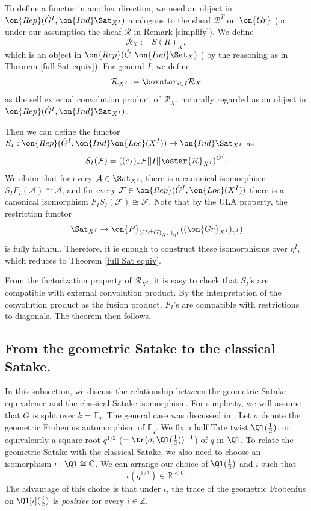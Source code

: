 \documentclass[]{pcmi}
\theoremstyle{plain}
\theoremstyle{remark}
\theoremstyle{definition}
\newcommand{\bC}{{\mathbb C}}
\newcommand{\bF}{{\mathbb F}}
\newcommand{\bR}{{\mathbb R}}
\newcommand{\bZ}{{\mathbb Z}}
\newcommand{\mA}{{\mathcal A}}
\newcommand{\mF}{{\mathcal F}}
\newcommand{\mR}{{\mathcal R}}
\newcommand{\Gr}{{\on{Gr}}}
\begin{document}
To define a functor in another direction, we need an object in $\on{Rep}(\hat G^I, {\on{Ind}\Sat_{X^I}})$ analogous to the sheaf $\mR^T$ on $\Gr$ (or under our assumption the sheaf $\mR$ in Remark \ref{simplify}).  
We define
\[\mR_X:= S(R)_X,\]
which is an object in $\on{Rep}(\hat G, {\on{Ind}\Sat_X})$ ( by the reasoning as in Theorem \ref{full Sat equiv}). For general $I$, we define
\[\mR_{X^I}:=\boxstar_{i\in I} \mR_X\]
as the self external convolution product of $\mR_X$, naturally regarded as an object in $\on{Rep}(\hat G^I,{\on{Ind}\Sat_{X^I}})$.

Then we can define the functor 
$S_{I}: \on{Rep}(\hat G^I,{\on{Ind}\on{Loc}(X^I)})\to \on{Ind}\Sat_{X^I}$ as
$$S_{I}(\mF)= ((e_I)_*\mF[|I|]\ostar\mR_{X^I})^{\hat G^I}.$$
We claim that for every $\mA\in\Sat_{X^I}$, there is a canonical isomorphism
$S_IF_I(\mA)\cong \mA$,
and for every $\mF\in \on{Rep}(\hat G^I, {\on{Loc}(X^I)})$ there is a canonical isomorphism
$F_IS_I(\mF)\cong \mF$.
Note that by the ULA property, the restriction functor
\[\Sat_{X^I}\to \on{P}_{((L^+G)_{X^I})_{\eta^I}}((\Gr_{X^I})_{\eta^I})\]
is fully faithful. Therefore, it is enough to construct these isomorphisms over $\eta^I$, which reduces to Theorem \ref{full Sat equiv}.


From the factorization property of $\mR_{X^I}$, it is easy to check that $S_I$'s are compatible with external convolution product. By the interpretation of the convolution product as the fusion product, $F_I$'s are compatible with restrictions to diagonals. The theorem then follows.







\subsection{From the geometric Satake to the classical Satake.}\label{applications of sat}

In this subsection, we discuss the relationship between the geometric Satake equivalence and the classical Satake isomorphism. For simplicity, we will assume that $G$ is split over $k=\bF_q$. The general case was discussed in \cite{RZ}. Let $\sigma$ denote the geometric Frobenius automorphism of $\bF_q$.
We fix a half Tate twist $\Ql(\frac{1}{2})$, or equivalently a square root $q^{1/2}$ ($=\tr(\sigma,\Ql(\frac{1}{2}))^{-1}$)  of $q$ in $\Ql$.  To relate the geometric Satake with the classical Satake, we also need to choose an isomorphism $\iota:\Ql\cong \bC$. We can arrange our choice of $\Ql(\frac{1}{2})$ and $\iota$ such that 
$$\iota(q^{1/2})\in \bR^{<0}.$$ The advantage of this choice is that under $\iota$, the trace of the geometric Frobenius on $\Ql[i](\frac{i}{2})$  is \emph{positive} for every $i\in \bZ$.
\end{document}
